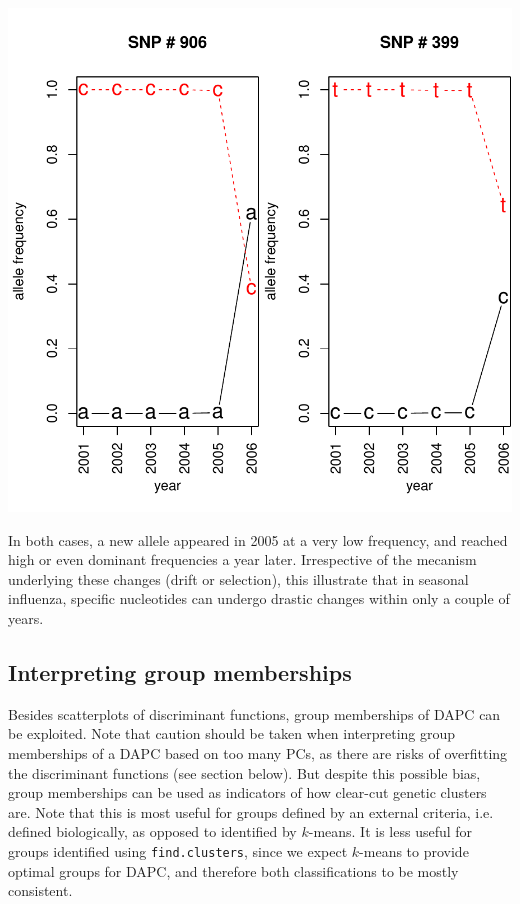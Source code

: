 \documentclass{article}
\begin{document}
\includegraphics{figs/dapc-019}

In both cases, a new allele appeared in 2005 at a very low frequency, and reached high or even dominant frequencies a
year later.
Irrespective of the mecanism underlying these changes (drift or selection), this illustrate that in
seasonal influenza, specific nucleotides can undergo drastic changes within only a couple of years.




\subsection{Interpreting group memberships}
Besides scatterplots of discriminant functions, group memberships of DAPC can be exploited.
Note that caution should be taken when interpreting group memberships of a DAPC based on too many
PCs, as there are risks of overfitting the discriminant functions (see section below).
But despite this possible bias, group memberships can be used as indicators of how
clear-cut genetic clusters are.
Note that this is most useful for groups defined by an external criteria, i.e. defined biologically, as opposed to identified by $k$-means.
It is less useful for groups identified using \texttt{find.clusters}, since we expect $k$-means to
provide optimal groups for DAPC, and therefore both classifications to be mostly consistent.
\\
\end{document}
